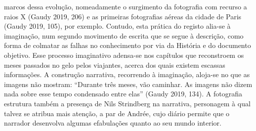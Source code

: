 \documentclass{article}
\begin{document}
marcos dessa evolução, nomeadamente o surgimento da fotografia com recurso a
raios X (Gaudy 2019, 206) e as primeiras fotografias aéreas da cidade de Paris
(Gaudy 2019, 105), por exemplo. Contudo, esta prática do registo alia-se à imaginação, num segundo movimento de escrita que se segue à descrição, como forma de
colmatar as falhas no conhecimento por via da História e do documento objetivo. Esse
processo imaginativo adensa-se nos capítulos que reconstroem os meses passados no
gelo pelos viajantes, acerca dos quais existem escassas informações. A construção
narrativa, recorrendo à imaginação, aloja-se no que as imagens não mostram: “Durante três meses, vão caminhar. As imagens não dizem nada sobre esse tempo condensado entre elas” (Gaudy 2019, 134).
A fotografia estrutura também a presença de Nils Strindberg na narrativa,
personagem à qual talvez se atribua mais atenção, a par de Andrée, cujo diário permite que o narrador desenvolva algumas efabulações quanto ao seu mundo interior.
\end{document}
